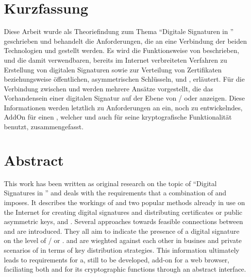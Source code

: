 

\noindent
\begin{minipage}{\textwidth}
\chapter*{Kurzfassung}
Diese Arbeit wurde als Theoriefindung zum Thema ``Digitale Signaturen in '' geschrieben und behandelt die Anforderungen, die an eine Verbindung
der beiden Technologien  und  gestellt werden. Es wird die Funktionsweise von  beschrieben, und die damit
verwendbaren, bereits im Internet verbreiteten Verfahren zu Erstellung von digitalen Signaturen sowie zur Verteilung von Zertifikaten beziehungsweise
öffentlichen, asymmetrischen Schlüsseln,  und , erläutert. Für die Verbindung zwischen  und
 werden mehrere Ansätze vorgestellt, die das Vorhandensein einer digitalen Signatur auf der Ebene von / oder
 anzeigen. Diese Informationen werden letztlich zu Anforderungen an ein, noch zu entwickelndes, AddOn für einen , welcher
 und auch  für seine kryptografische Funktionalität benutzt, zusammengefasst.

\chapter*{Abstract}
This work has been written as original research on the topic of "`Digital Signatures in "' and deals with the requirements that a combination of
 and  imposes. It describes the workings of  and two popular methods already in use on the Internet for
creating digital signatures and distributing certificates or public asymmetric keys,  and . Several approaches towards feasible
connections between  and  are introduced. They all aim to indicate the presence of a digital signature on the level of
/ or .  and  are wieghted against each other in busines and private scenarios of
in terms of key distribution strategies. This information ultimately leads to requirements for a, still to be developed, add-on for a web browser, faciliating
both  and  for its cryptographic functions through an abstract interface.

\end{minipage}

